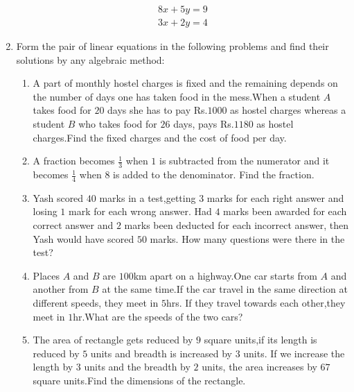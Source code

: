 \documentclass{article}
\theoremstyle{remark}
\begin{document}
\begin{enumerate}
\begin{align}
8x+5y=9
\\ 3x+2y=4
\end{align}
\item Form the pair of linear equations in the following problems and find their solutions by any algebraic method:
\begin{enumerate}[label=(\roman*)]
\item A part of monthly hostel charges is fixed and the remaining depends on the number of days one has taken food in the mess.When a student $A$ takes food for $20$ days she has to pay Rs.$1000$ as hostel charges whereas a student $B$ who takes food for $26$ days, pays Rs.$1180$ as hostel charges.Find the fixed charges and the cost of food per day.
\item A fraction becomes $\frac{1}{3}$ when $1$ is subtracted from the numerator and it becomes $\frac{1}{4}$ when $8$ is added to the denominator. Find the fraction.
\item Yash scored $40$ marks in a test,getting $3$ marks for each right answer and losing $1$ mark for each wrong answer. Had $4$ marks been awarded for each correct answer and $2$ marks been deducted for each incorrect answer, then Yash would have scored $50$ marks. How many questions were there in the test?
\item Places $A$ and $B$ are $100$km apart on a highway.One car starts from $A$ and another from $B$ at the same time.If the car travel in the same direction at different speeds, they meet in $5$hrs. If they travel towards each other,they meet in $1$hr.What are the speeds of the two cars?
\item The area of rectangle gets reduced by $9$ square units,if its length is reduced by $5$ units and breadth is increased by $3$ units. If we increase the length by $3$ units and the breadth by $2$ units, the area increases by $67$ square units.Find the dimensions of the rectangle.
\end{enumerate}
\end{enumerate}
\end{document}
